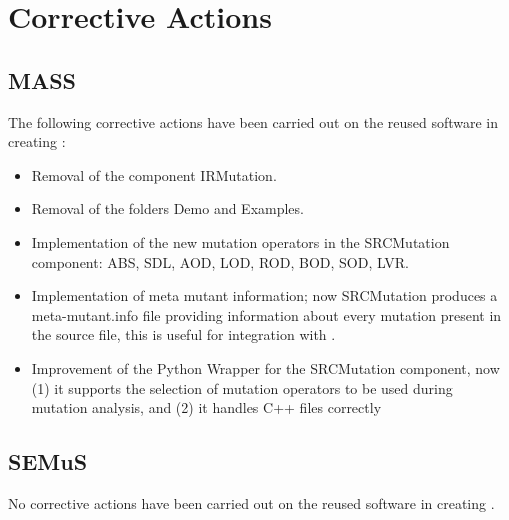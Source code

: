 
\chapter{Corrective Actions}

\section{MASS}

The following corrective actions have been carried out on the reused software in creating \MASS:

\begin{itemize}
	\item Removal of the component IRMutation.
	\item Removal of the folders Demo and Examples.
	\item Implementation of the new mutation operators in the SRCMutation component: ABS, SDL, AOD, LOD, ROD, BOD, SOD, LVR.
	\item Implementation of meta mutant information; now SRCMutation produces a meta-mutant.info file providing information about every mutation present in the source file, this is useful for integration with \SEMUS.
	\item Improvement of the Python Wrapper for the SRCMutation component, now (1) it supports the selection of mutation operators to be used during mutation analysis, and (2) it handles C++ files correctly
\end{itemize}


\section{SEMuS}

No corrective actions have been carried out on the reused software in creating \SEMUS.
